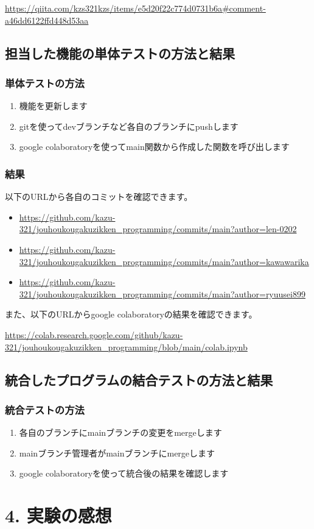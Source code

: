 \documentclass[a4paper,11pt]{jsarticle}
\begin{document}
\url{https://qiita.com/kzs321kzs/items/e5d20f22c774d0731b6a#comment-a46dd6122ffd448d53aa}

\newpage

\subsection*{担当した機能の単体テストの方法と結果}
\subsubsection*{単体テストの方法}
\begin{enumerate}
    \item 機能を更新します
    \item gitを使ってdevブランチなど各自のブランチにpushします
    \item google colaboratoryを使ってmain関数から作成した関数を呼び出します
\end{enumerate}

\subsubsection*{結果}
以下のURLから各自のコミットを確認できます。
\begin{itemize}
    \item \url{https://github.com/kazu-321/jouhoukougakuzikken_programming/commits/main?author=len-0202}
    \item \url{https://github.com/kazu-321/jouhoukougakuzikken_programming/commits/main?author=kawawarika}
    \item \url{https://github.com/kazu-321/jouhoukougakuzikken_programming/commits/main?author=ryuusei899}
\end{itemize}

また、以下のURLからgoogle colaboratoryの結果を確認できます。

\url{https://colab.research.google.com/github/kazu-321/jouhoukougakuzikken_programming/blob/main/colab.ipynb}

\subsection*{統合したプログラムの結合テストの方法と結果}
\subsubsection*{統合テストの方法}
\begin{enumerate}
    \item 各自のブランチにmainブランチの変更をmergeします
    \item mainブランチ管理者がmainブランチにmergeします
    \item google colaboratoryを使って統合後の結果を確認します
\end{enumerate}


\section*{4. 実験の感想}
\end{document}
